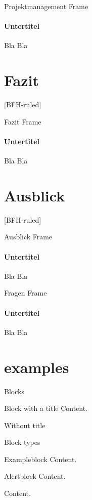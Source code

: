 \documentclass[
	ngerman,%
	authorontitle=true,
	]{bfhbeamer}
\begin{document}
\begin{frame}{Projektmanagement Frame}
	\framesubtitle{Untertitel}
	Bla Bla
\end{frame}

\section{Fazit}\label{sec:fazit}
[BFH-ruled]
\frame{\sectionpage}

\begin{frame}{Fazit Frame}
	\framesubtitle{Untertitel}
	Bla Bla
\end{frame}

\section{Ausblick}\label{sec:ausblick}
[BFH-ruled]
\frame{\sectionpage}

\begin{frame}{Ausblick Frame}
	\framesubtitle{Untertitel}
	Bla Bla
\end{frame}

\begin{frame}{Fragen Frame}
	\framesubtitle{Untertitel}
	Bla Bla
\end{frame}

\section{examples}\label{sec:examples}
\begin{frame}{Blocks}
	\begin{block}{Block with a title}
		Content.
	\end{block}
	\begin{block}{}
		Without title
	\end{block}
\end{frame}

\begin{frame}{Block types}
	\begin{exampleblock}{Exampleblock}
		Content.
	\end{exampleblock}
	\begin{alertblock}{Alertblock}
		Content.
	\end{alertblock}
	\begin{example}
		Content.
	\end{example}
\end{frame}
\end{document}
